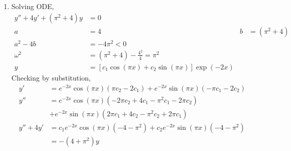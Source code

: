 \begin{enumerate}
    \item Solving ODE,
          \begin{align}
              y'' + 4y' + (\pi^{2} + 4)y & = 0                                       \\
              a                          & = 4                                     &
              b                          & = (\pi^{2} + 4)                           \\
              a^{2} - 4b                 & = -4\pi ^{2} < 0                          \\
              \omega^{2}                 & = (\pi ^{2} + 4) - \frac{4^{2}}{4}
              = \pi ^{2}                                                             \\
              y                          & = [c_{1}\cos(\pi x) + c_{2}\sin(\pi x)]
              \exp(-2x)
          \end{align}
          Checking by substitution,
          \begin{align}
              y'        & = e^{-2x}\cos(\pi x) (\pi c_{2} - 2c_{1})
              + e^{-2x}\sin(\pi x)(-\pi c_{1} - 2c_{2})             \\
              y''       & = e^{-2x}\cos(\pi x)(-2\pi c_{2} + 4c_{1}
              - \pi ^{2}c_{1} - 2\pi c_{2})                         \\
                        & + e^{-2x}\sin(\pi x)(2\pi c_{1} + 4c_{2}
              - \pi ^{2}c_{2} + 2\pi c_{1})                         \\
              y'' + 4y' & = c_{1}e^{-2x}\cos(\pi x)(-4-\pi ^{2})
              + c_{2}e^{-2x}\sin(\pi x)(-4-\pi ^{2})                \\
                        & = -(4 + \pi ^{2})y
          \end{align}


\end{enumerate}
